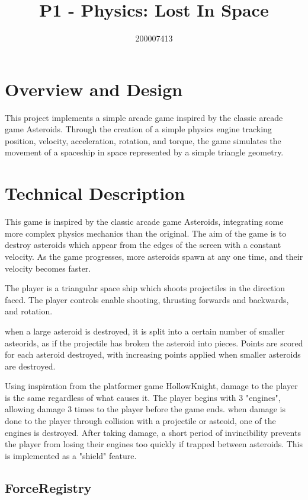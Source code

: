 \documentclass[12pt, a4paper]{article}
\title{P1 - Physics: Lost In Space}
\author{200007413}
\date{}
\begin{document}
{\bfseries\huge\thetitle}

{\large\theauthor}

\section{Overview and Design}

This project implements a simple arcade game inspired by the classic arcade game Asteroids. Through the creation of a simple physics engine tracking position, velocity, acceleration, rotation, and torque, the game simulates the movement of a spaceship in space represented by a simple triangle geometry.

\section{Technical Description}

This game is inspired by the classic arcade game Asteroids, integrating some more complex physics mechanics than the original. The aim of the game is to destroy asteroids which appear from the edges of the screen with a constant velocity. As the game progresses, more asteroids spawn at any one time, and their velocity becomes faster.

The player is a triangular space ship which shoots projectiles in the direction faced. The player controls enable shooting, thrusting forwards and backwards, and rotation.


when a large asteroid is destroyed, it is split into a certain number of smaller asteorids, as if the projectile has broken the asteroid into pieces. Points are scored for each asteroid destroyed, with increasing points applied when smaller asteroids are destroyed.

Using inspiration from the platformer game HollowKnight, damage to the player is the same regardless of what causes it. The player begins with 3 "engines", allowing damage 3 times to the player before the game ends. when damage is done to the player through collision with a projectile or asteoid, one of the engines is destroyed. After taking damage, a short period of invincibility prevents the player from losing their engines too quickly if trapped between asteroids. This is implemented as a "shield" feature.

\subsection{ForceRegistry}
\end{document}
